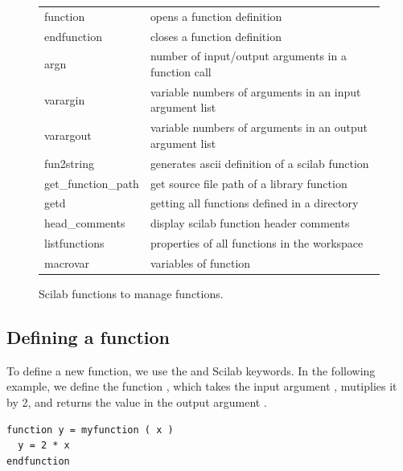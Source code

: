 \begin{figure}
\begin{center}
\begin{tabular}{|ll|}
\hline
function & opens a function definition \\
endfunction & closes a function definition\\
\hline
argn & number of input/output arguments in a function call\\
varargin & variable numbers of arguments in an input argument list\\
varargout & variable numbers of arguments in an output argument list\\
\hline
fun2string & generates ascii definition of a scilab function\\
get\_function\_path & get source file path of a library function\\
getd & getting all functions defined in a directory\\
head\_comments & display scilab function header comments\\
listfunctions & properties of all functions in the workspace\\
macrovar & variables of function\\
\hline
\end{tabular}
\end{center}
\caption{Scilab functions to manage functions.}
\label{fig-introscilab-managefuns}
\end{figure}


\subsection{Defining a function}

To define a new function, we use the 
and  Scilab keywords. In the following 
example, we define the function , which 
takes the input argument , mutiplies it by 2, and 
returns the value in the output argument .

\lstset{language=scilabscript}
\begin{lstlisting}
function y = myfunction ( x )
  y = 2 * x
endfunction
\end{lstlisting}

